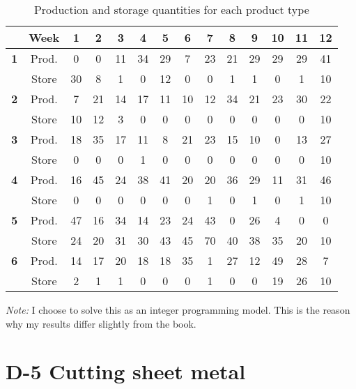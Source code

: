\documentclass[11pt,oneside]{article}
\begin{document}
\begin{table}[h]
    \center
    \caption{Production and storage quantities for each product type}
\begin{tabular}{cccccccccccccc}
    \hline
    & \textbf{Week} & \textbf{1} &\textbf{2} &\textbf{3} &\textbf{4} &\textbf{5} &\textbf{6} &\textbf{7} &\textbf{8} &\textbf{9} &\textbf{10} &\textbf{11} &\textbf{12} \\
    \hline
    \textbf{1} & Prod. & 0 & 0 & 11 & 34 & 29 & 7 & 23 & 21 & 29 & 29 & 29 & 41\\
& Store & 30 & 8 & 1 & 0 & 12 & 0 & 0 & 1 & 1 & 0 & 1 & 10\\
\textbf{2} & Prod. & 7 & 21 & 14 & 17 & 11 & 10 & 12 & 34 & 21 & 23 & 30 & 22\\
& Store & 10 & 12 & 3 & 0 & 0 & 0 & 0 & 0 & 0 & 0 & 0 & 10\\
\textbf{3} & Prod. & 18 & 35 & 17 & 11 & 8 & 21 & 23 & 15 & 10 & 0 & 13 & 27\\
& Store & 0 & 0 & 0 & 1 & 0 & 0 & 0 & 0 & 0 & 0 & 0 & 10\\
\textbf{4} & Prod. & 16 & 45 & 24 & 38 & 41 & 20 & 20 & 36 & 29 & 11 & 31 & 46\\
& Store & 0 & 0 & 0 & 0 & 0 & 0 & 1 & 0 & 1 & 0 & 1 & 10\\
\textbf{5} & Prod. & 47 & 16 & 34 & 14 & 23 & 24 & 43 & 0 & 26 & 4 & 0 & 0\\
& Store & 24 & 20 & 31 & 30 & 43 & 45 & 70 & 40 & 38 & 35 & 20 & 10\\
\textbf{6} & Prod. & 14 & 17 & 20 & 18 & 18 & 35 & 1 & 27 & 12 & 49 & 28 & 7\\
& Store & 2 & 1 & 1 & 0 & 0 & 0 & 1 & 0 & 0 & 19 & 26 & 10\\
\hline
\end{tabular}
\end{table}

\emph{Note:} I choose to solve this as an integer programming model. This is
the reason why my results differ slightly from the book.

\section{D-5 Cutting sheet metal}
\end{document}

